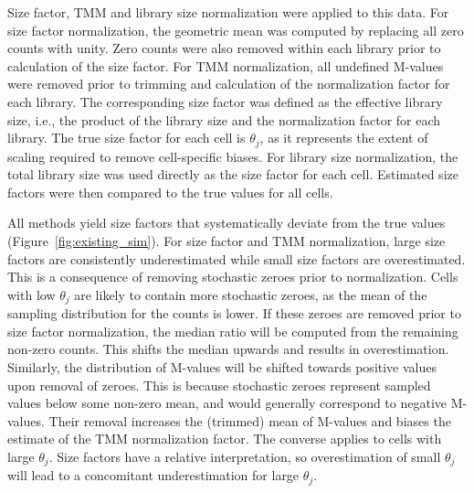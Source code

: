 \documentclass{article}
\begin{document}
Size factor, TMM and library size normalization were applied to this data.
For size factor normalization, the geometric mean was computed by replacing all zero counts with unity.
Zero counts were also removed within each library prior to calculation of the size factor.
For TMM normalization, all undefined M-values were removed prior to trimming and calculation of the normalization factor for each library.
The corresponding size factor was defined as the effective library size, i.e., the product of the library size and the normalization factor for each library.
The true size factor for each cell is $\theta_j$, as it represents the extent of scaling required to remove cell-specific biases.
For library size normalization, the total library size was used directly as the size factor for each cell.
Estimated size factors were then compared to the true values for all cells.

All methods yield size factors that systematically deviate from the true values (Figure~\ref{fig:existing_sim}).
For size factor and TMM normalization, large size factors are consistently underestimated while small size factors are overestimated.
This is a consequence of removing stochastic zeroes prior to normalization.
Cells with low $\theta_j$ are likely to contain more stochastic zeroes, as the mean of the sampling distribution for the counts is lower.
If these zeroes are removed prior to size factor normalization, the median ratio will be computed from the remaining non-zero counts.
This shifts the median upwards and results in overestimation.
Similarly, the distribution of M-values will be shifted towards positive values upon removal of zeroes.
This is because stochastic zeroes represent sampled values below some non-zero mean, and would generally correspond to negative M-values.
Their removal increases the (trimmed) mean of M-values and biases the estimate of the TMM normalization factor.
The converse applies to cells with large $\theta_j$.
Size factors have a relative interpretation, so overestimation of small $\theta_j$ will lead to a concomitant underestimation for large $\theta_j$.
\end{document}
